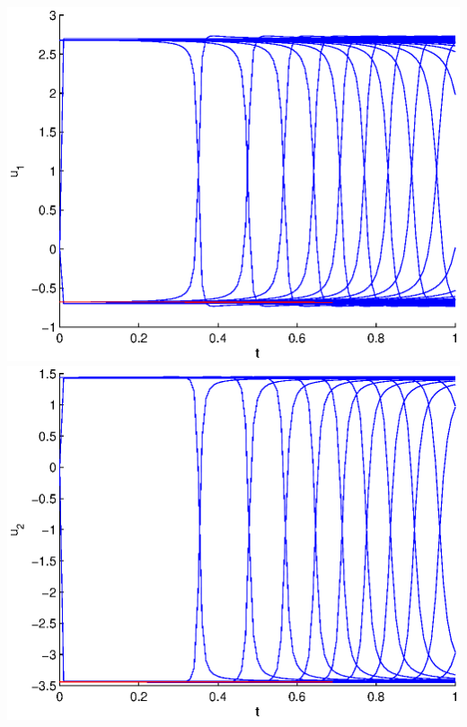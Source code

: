 \documentclass[11pt]{article}
\begin{document}
\includegraphics[scale=0.6]{pics/pic1_u1.eps}
\includegraphics[scale=0.6]{pics/pic1_u2.eps}
\end{document}
